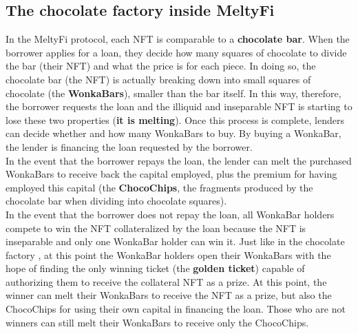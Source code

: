 \subsection{The chocolate factory inside MeltyFi}
In the MeltyFi protocol, each NFT is comparable to a \textbf{chocolate bar}. When the borrower applies for a loan, they decide how many squares of chocolate to divide the bar (their NFT) and what the price is for each piece. In doing so, the chocolate bar (the NFT) is actually breaking down into small squares of chocolate (the \textbf{WonkaBars}), smaller than the bar itself. In this way, therefore, the borrower requests the loan and the illiquid and inseparable NFT is starting to lose these two properties (\textbf{it is melting}). Once this process is complete, lenders can decide whether and how many WonkaBars to buy. By buying a WonkaBar, the lender is financing the loan requested by the borrower. 
\\
\indent In the event that the borrower repays the loan, the lender can melt the purchased WonkaBars to receive back the capital employed, plus the premium for having employed this capital (the \textbf{ChocoChips}, the fragments produced by the chocolate bar when dividing into chocolate squares).
\\
\indent In the event that the borrower does not repay the loan, all WonkaBar holders compete to win the NFT collateralized by the loan because the NFT is inseparable and only one WonkaBar holder can win it. Just like in the chocolate factory \cite{chocolatefactory}, at this point the WonkaBar holders open their WonkaBars with the hope of finding the only winning ticket (the \textbf{golden ticket}) capable of authorizing them to receive the collateral NFT as a prize. At this point, the winner can melt their WonkaBars to receive the NFT as a prize, but also the ChocoChips for using their own capital in financing the loan. Those who are not winners can still melt their WonkaBars to receive only the ChocoChips.

